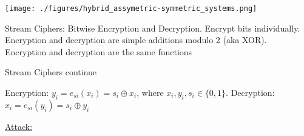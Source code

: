 \documentclass[landscape, a4paper]{article}
\begin{document}
\begin{minipage}[t]{0.2\linewidth}
\begin{betterlist}
\begin{betterlist}
		\end{betterlist}
		\texttt{[image: ./figures/hybrid\_assymetric-symmetric\_systems.png]}
	\end{betterlist}
	\begin{betterlist}
		\item \alert{Stream Ciphers:} Bitwise Encryption and Decryption. Encrypt bits individually. Encryption and decryption are simple additions modulo 2 (aka XOR). Encryption and decryption are the same functions
	\end{betterlist}
\end{minipage}
\begin{minipage}[t]{0.2\linewidth}
	\begin{betterlist}
		\item \alert{Stream Ciphers continue}
		\begin{betterlist}
			\item \alert{Encryption:} $y_i = e_{si}(x_i) = s_i \oplus x_i$, where $x_i, y_i, s_i \in \{0, 1\}$. \alert{Decryption:} $x_i = e_{si}(y_i) = s_i \oplus y_i$
			\begin{betterlist}
				\item \underline{Attack:}


\end{betterlist}
\end{betterlist}
\end{betterlist}
\end{minipage}
\end{document}
